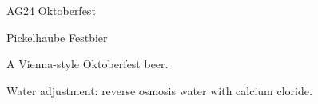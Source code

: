 \begin{recipe}{AG24 Oktoberfest}
\begin{recipe}{Pickelhaube Festbier} %

\begin{aboutblock}
A Vienna-style Oktoberfest beer. 
\end{aboutblock}


\begin{methodandtiming}
 
\begin{mashsteps}
\end{mashsteps}

\begin{fermentationsteps}
\end{fermentationsteps}

\begin{directions}
Water adjustment: reverse osmosis water with  calcium cloride.
\end{directions}

\end{methodandtiming}

\recipebreak

\begin{ingredientsblock}

\begin{malts}
\end{malts}

\begin{hops}
\end{hops}


\end{ingredientsblock}

\end{recipe}


\end{recipe}
